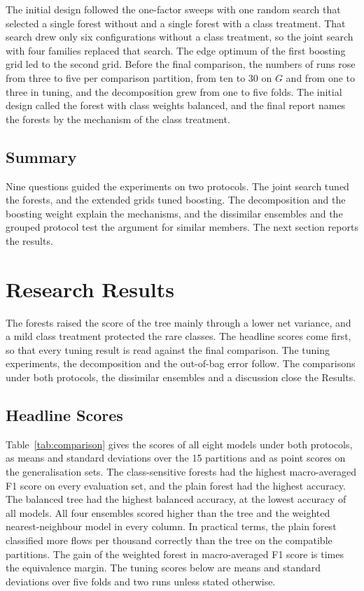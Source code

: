 \documentclass[10pt,conference]{IEEEtran}
\begin{document}
The initial design followed the one-factor sweeps with one random search that selected a single forest without and a single forest with a class treatment. That search drew only six configurations without a class treatment, so the joint search with four families replaced that search. The edge optimum of the first boosting grid led to the second grid. Before the final comparison, the numbers of runs rose from three to five per comparison partition, from ten to 30 on $G$ and from one to three in tuning, and the decomposition grew from one to five folds. The initial design called the forest with class weights balanced, and the final report names the forests by the mechanism of the class treatment.

\subsection{Summary}
\label{sec:procedure-summary}

Nine questions guided the experiments on two protocols. The joint search tuned the forests, and the extended grids tuned boosting. The decomposition and the boosting weight explain the mechanisms, and the dissimilar ensembles and the grouped protocol test the argument for similar members. The next section reports the results.

\section{Research Results}
\label{sec:results}

The forests raised the score of the tree mainly through a lower net variance, and a mild class treatment protected the rare classes. The headline scores come first, so that every tuning result is read against the final comparison. The tuning experiments, the decomposition and the out-of-bag error follow. The comparisons under both protocols, the dissimilar ensembles and a discussion close the Results.

\subsection{Headline Scores}
\label{sec:res-headline}

Table~\ref{tab:comparison} gives the scores of all eight models under both protocols, as means and standard deviations over the 15 partitions and as point scores on the generalisation sets. The class-sensitive forests had the highest macro-averaged F1 score on every evaluation set, and the plain forest had the highest accuracy. The balanced tree had the highest balanced accuracy, at the lowest accuracy of all models. All four ensembles scored higher than the tree and the weighted nearest-neighbour model in every column. In practical terms, the plain forest classified \OSCompRfVsTreeAccuracyPerK{} more flows per thousand correctly than the tree on the compatible partitions. The gain of the weighted forest in macro-averaged F1 score is \OSCompRfWVsTreeMacroFMargins{} times the equivalence margin. The tuning scores below are means and standard deviations over five folds and two runs unless stated otherwise.
\end{document}
